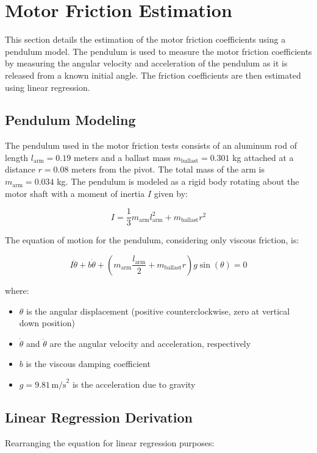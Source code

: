 \section{Motor Friction Estimation}
\label{sec:motor_friction_estimation}

This section details the estimation of the motor friction coefficients using a pendulum model. The pendulum is used to measure the motor friction coefficients by measuring the angular velocity and acceleration of the pendulum as it is released from a known initial angle. The friction coefficients are then estimated using linear regression.




\subsection{Pendulum Modeling}

The pendulum used in the motor friction tests consists of an aluminum rod of length \( l_{\text{arm}} = 0.19 \) meters and a ballast mass \( m_{\text{ballast}} = 0.301 \) kg attached at a distance \( r = 0.08 \) meters from the pivot. The total mass of the arm is \( m_{\text{arm}} = 0.034 \) kg. The pendulum is modeled as a rigid body rotating about the motor shaft with a moment of inertia \( I \) given by:

\[
I = \frac{1}{3} m_{\text{arm}} l_{\text{arm}}^2 + m_{\text{ballast}} r^2
\]

The equation of motion for the pendulum, considering only viscous friction, is:

\[
I \ddot{\theta} + b \dot{\theta} + (m_{\text{arm}} \frac{l_{\text{arm}}}{2} + m_{\text{ballast}} r) g \sin(\theta) = 0
\]

where:
\begin{itemize}
    \item \( \theta \) is the angular displacement (positive counterclockwise, zero at vertical down position)
    \item \( \dot{\theta} \) and \( \ddot{\theta} \) are the angular velocity and acceleration, respectively
    \item \( b \) is the viscous damping coefficient
    \item \( g = 9.81 \, \text{m/s}^2 \) is the acceleration due to gravity
\end{itemize}

\subsection{Linear Regression Derivation}
Rearranging the equation for linear regression purposes:

